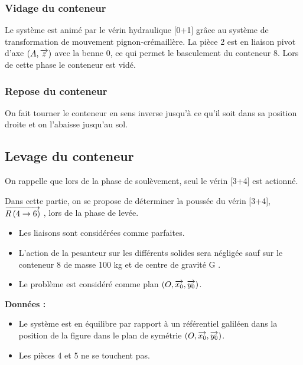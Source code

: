 \documentclass[10pt]{article}
\begin{document}
 
 
\subsubsection*{Vidage du conteneur}
Le système est animé par le vérin hydraulique [0+1] grâce au système de transformation de mouvement 
pignon-crémaillère. La pièce 2 est en liaison pivot d’axe 
$(A,\overrightarrow{z})$ avec la benne 0, ce qui permet le 
basculement du conteneur 8. Lors de cette phase le conteneur est vidé. 
 
 
\subsubsection*{Repose du conteneur}
On fait tourner le conteneur en sens inverse jusqu’à ce qu’il soit dans sa position droite et on l’abaisse 
jusqu’au sol. 


\subsection*{Levage du conteneur}
On rappelle que lors de la phase de soulèvement, seul le vérin [3+4] est actionné. 

\begin{obj}
Dans cette partie, on se propose de déterminer la poussée du vérin [3+4], $\overrightarrow{R\left( {4} \rightarrow {6}\right)}$ , lors de la phase de levée. 
\end{obj}

\begin{hypo}
\begin{itemize}
\item Les liaisons sont considérées comme parfaites. 
\item L’action de la pesanteur sur les différents solides sera négligée sauf sur le conteneur 8 de masse 
100 kg et de centre de gravité G . 
\item Le problème est considéré comme plan $\left(O,\overrightarrow{x_0},\overrightarrow{y_0} \right)$.
\end{itemize}
\end{hypo}

\textbf{Données :}
\begin{itemize}
\item Le système est en équilibre par rapport à un référentiel galiléen dans la position de la figure dans le 
plan de symétrie $\left(O,\overrightarrow{x_0},\overrightarrow{y_0} \right)$. 
\item Les pièces 4 et 5 ne se touchent pas. 
\end{itemize}
\end{document}
